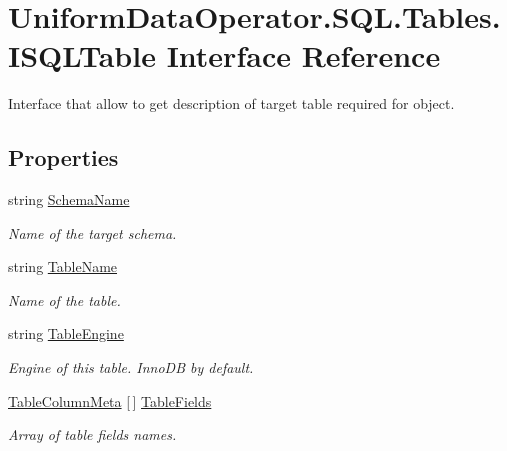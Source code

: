 \hypertarget{interface_uniform_data_operator_1_1_s_q_l_1_1_tables_1_1_i_s_q_l_table}{}\section{Uniform\+Data\+Operator.\+S\+Q\+L.\+Tables.\+I\+S\+Q\+L\+Table Interface Reference}
\label{interface_uniform_data_operator_1_1_s_q_l_1_1_tables_1_1_i_s_q_l_table}


Interface that allow to get description of target table required for object.  


\subsection*{Properties}
\begin{DoxyCompactItemize}
\item 
string \mbox{\hyperlink{interface_uniform_data_operator_1_1_s_q_l_1_1_tables_1_1_i_s_q_l_table_afe5c80cd1f594bfdd6f0ba3d9ffaf674}{Schema\+Name}}
\begin{DoxyCompactList}\small\item\em Name of the target schema. \end{DoxyCompactList}\item 
string \mbox{\hyperlink{interface_uniform_data_operator_1_1_s_q_l_1_1_tables_1_1_i_s_q_l_table_ae29ed8f9fa5796db79a6f30c2006d79a}{Table\+Name}}
\begin{DoxyCompactList}\small\item\em Name of the table. \end{DoxyCompactList}\item 
string \mbox{\hyperlink{interface_uniform_data_operator_1_1_s_q_l_1_1_tables_1_1_i_s_q_l_table_a13b1d02d264dc49bf8998a2c84e491d4}{Table\+Engine}}
\begin{DoxyCompactList}\small\item\em Engine of this table. Inno\+DB by default. \end{DoxyCompactList}\item 
\mbox{\hyperlink{struct_uniform_data_operator_1_1_s_q_l_1_1_tables_1_1_table_column_meta}{Table\+Column\+Meta}} \mbox{[}$\,$\mbox{]} \mbox{\hyperlink{interface_uniform_data_operator_1_1_s_q_l_1_1_tables_1_1_i_s_q_l_table_a7cd3fd1a60284eb30b48fb7deabec462}{Table\+Fields}}
\begin{DoxyCompactList}\small\item\em Array of table fields names. \end{DoxyCompactList}\end{DoxyCompactItemize}


